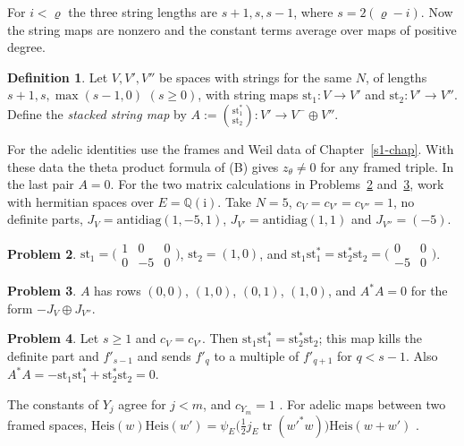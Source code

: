 \documentclass[reqno]{amsart}
\newcounter{chap}
\theoremstyle{definition}
\newtheorem{problem}{Problem}[section]
\newtheorem{definition}[problem]{Definition}
\theoremstyle{plain}
\theoremstyle{remark}
\newcommand{\ii}{\mathrm{i}}
\newcommand{\Heis}{\mathrm{Heis}}
\newcommand{\st}{\mathrm{st}}
\begin{document}
For \(i<\varrho\) the three string lengths are \(s+1,s,s-1\), where \(s=2(\varrho-i)\).  Now the string maps are nonzero and the constant terms average over maps of positive degree.

\begin{definition}\label{def:stacked}
Let \(V, V', V''\) be spaces with strings for the same \(N\), of lengths \(s+1, s, \max(s-1, 0)\) \((s \ge 0)\), with string maps \(\st_1 \colon V \to V'\) and \(\st_2 \colon V' \to V''\).  Define the \emph{stacked string map} by \(A := \binom{\st_1^*}{\st_2} \colon V' \to V^- \oplus V''\).
\end{definition}

For the adelic identities use the frames and Weil data of Chapter~\ref{s1-chap}.  With these data the theta product formula of (B) gives \(z_\theta\ne0\) for any framed triple.  In the last pair \(A=0\).  For the two matrix calculations in Problems~\ref{pr:st-instance} and~\ref{pr:A-instance}, work with hermitian spaces over \(E=\mathbb Q(\ii)\).  Take \(N=5\), \(c_V=c_{V'}=c_{V''}=1\), no definite parts, \(J_V=\mathrm{antidiag}(1,-5,1)\), \(J_{V'}=\mathrm{antidiag}(1,1)\) and \(J_{V''}=(-5)\).

\begin{problem}\label{pr:st-instance}
\(\st_1 = \bigl(\begin{smallmatrix} 1&0&0\\ 0&-5&0 \end{smallmatrix}\bigr)\), \(\st_2 = (1, 0)\), and \(\st_1\st_1^* = \st_2^*\st_2 = \bigl(\begin{smallmatrix} 0&0\\ -5&0 \end{smallmatrix}\bigr)\).
\end{problem}

\begin{problem}\label{pr:A-instance}
\(A\) has rows \((0,0)\), \((1,0)\), \((0,1)\), \((1,0)\), and \(A^*A = 0\) for the form \(-J_V \oplus J_{V''}\).
\end{problem}

\begin{problem}\label{pr:isotropic}
Let \(s \ge 1\) and \(c_V = c_{V'}\).  Then \(\st_1\st_1^* = \st_2^*\st_2\); this map kills the definite part and \(f'_{s-1}\) and sends \(f'_q\) to a multiple of \(f'_{q+1}\) for \(q < s - 1\).  Also \(A^*A = -\st_1\st_1^* + \st_2^*\st_2 = 0\).
\end{problem}

The constants of \(Y_j\) agree for \(j<m\), and \(c_{Y_m}=1\) \cite[EdgePairEvaluation, lines 1144--1162]{GL}.  For adelic maps between two framed spaces, \(\Heis(w)\Heis(w')=\psi_E\bigl(\tfrac12j_E\operatorname{tr}(w'^*w)\bigr)\Heis(w+w')\) \cite[HeisenbergModel, line 74, and WeilAction, line 775]{GL}.
\end{document}
